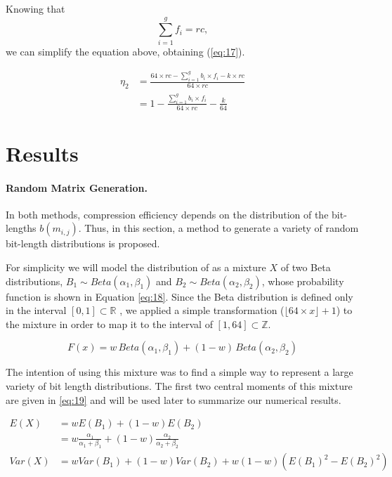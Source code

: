 \documentclass[10pt]{article}
\begin{document}
 Knowing that $$\sum_{i=1}^{g} f_i = rc, $$ we can simplify the equation above, obtaining (\ref{eq:17}).
 
\begin{align}\label{eq:17}
 \eta_2 &= \frac{64 \times rc - \sum_{i=1}^{g}  b_i \times f_i  - k \times rc }{64 \times rc}\nonumber \\
  &= 1 - \frac{\sum_{i=1}^{g}  b_i \times f_i }{64 \times rc} - \frac{k}{64}
\end{align}

\section*{Results}

\paragraph{Random Matrix Generation.}
In both methods, compression efficiency depends on the distribution of the bit-lengths $b(m_{i,j})$. Thus, in this section, a method to generate a variety of random bit-length distributions is proposed.

For simplicity we will model the distribution of  as a mixture $X$ of two Beta distributions, $B_1 \sim Beta(\alpha_1,\beta_1)$ and $B_2 \sim Beta(\alpha_2,\beta_2)$, whose probability function is shown in Equation \ref{eq:18}. Since the Beta distribution is defined only in the interval $[0,1] \subset \mathbb{R}$ , we applied a simple transformation ($\lfloor 64 \times x \rfloor + 1$) to the mixture in order to map it to the interval of $[1,64] \subset \mathbb{Z}$.

\begin{equation}\label{eq:18}
 F(x) =  w \, Beta(\alpha_1,\beta_1) + (1-w)\,Beta(\alpha_2,\beta_2)
\end{equation}

The intention of using this mixture was to find a simple way to represent a large variety of bit length distributions. The first two central moments of this mixture are given in \ref{eq:19} and will be used later to summarize our numerical results.

\begin{align}\label{eq:19}
 E(X) &= w E(B_1) + (1-w) E(B_2) \nonumber \\
 &= w \frac{\alpha_1}{\alpha_1+\beta_1} + (1-w)\frac{\alpha_2}{\alpha_2+\beta_2}\nonumber \\
 Var(X) &= w Var(B_1) + (1-w) Var(B_2) + w (1-w) (E(B_1)^2 - E(B_2)^2)
\end{align}
\end{document}

